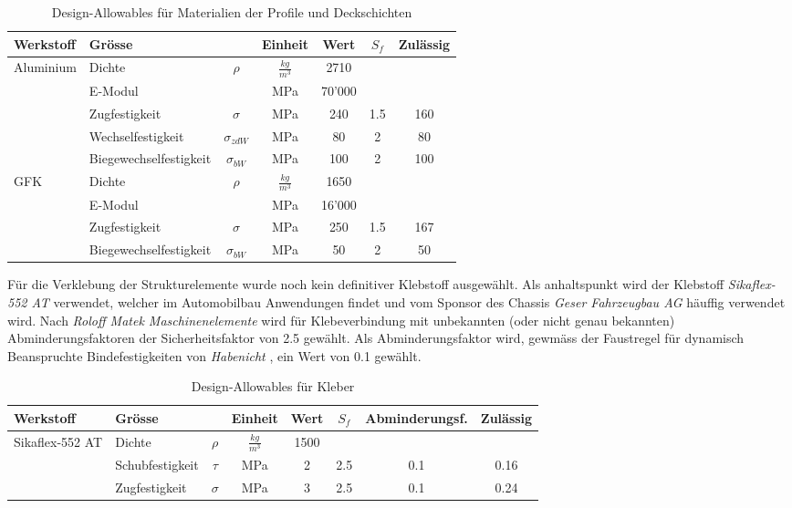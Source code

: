 \begin{table}[H]
  \centering
  \caption{Design-Allowables für Materialien der Profile und Deckschichten}
  \begin{tabular}{llccccc}	\hline
    Werkstoff	&	Grösse	&		&	Einheit	&	Wert	&	$S_f$	&	Zulässig\\	\hline
    \multirow{5}{*}{Aluminium\cite{alu1}}	&	Dichte	&	$\rho$        	&	$\frac{kg}{m^3}$	&	2710	&		&		\\
      &	E-Modul	&	              	&	MPa	&	70'000	&		&		\\
      &	Zugfestigkeit	&	$\sigma$      	&	MPa	&	240	&	1.5	&	160	\\
      &	Wechselfestigkeit	&	$\sigma_{zdW}$	&	MPa	&	80	&	2	&	80	\\
      &	Biegewechselfestigkeit	&	$\sigma_{bW}$ 	&	MPa	&	100	&	2	&	100	\\	\hline
    \multirow{4}{*}{GFK\cite{Roloff}}	&	Dichte	&	$\rho$        	&	$\frac{kg}{m^3}$	&	1650	&		&		\\
      &	E-Modul	&	              	&	MPa	&	16'000	&		&		\\
      &	Zugfestigkeit	&	$\sigma$      	&	MPa	&	250	&	1.5	&	167	\\
      &	Biegewechselfestigkeit	&	$\sigma_{bW}$ 	&	MPa	&	50	&	2	&	50	\\	\hline
  \end{tabular}
  \label{tab:Design-Allowables}
\end{table}

Für die Verklebung der Strukturelemente wurde noch kein definitiver Klebstoff ausgewählt. Als anhaltspunkt wird der Klebstoff \emph{Sikaflex-552 AT} verwendet, welcher im Automobilbau Anwendungen findet und vom Sponsor des Chassis \emph{Geser Fahrzeugbau AG} häuffig verwendet wird. Nach \emph{Roloff Matek Maschinenelemente} wird für Klebeverbindung mit unbekannten (oder nicht genau bekannten) Abminderungsfaktoren der Sicherheitsfaktor von 2.5 gewählt. Als Abminderungsfaktor wird, gewmäss der Faustregel für dynamisch Beanspruchte Bindefestigkeiten von \emph{Habenicht} \cite{kleben1}, ein Wert von 0.1 gewählt.

\begin{table}[H]
  \centering
  \caption{Design-Allowables für Kleber}
  \begin{tabular}{llcccccc}	\hline
    Werkstoff	&	Grösse	&		&	Einheit	&	Wert	&	$S_f$	&	Abminderungsf.&	Zulässig	\\	\hline
    \multirow{3}{*}{Sikaflex-552 AT}	&	Dichte	&	$\rho$        	&	$\frac{kg}{m^3}$	&	1500	&		&		&		\\
      &	Schubfestigkeit	&	$\tau$	&	MPa	&	2	&	2.5	&	0.1	&	0.16	\\
      &	Zugfestigkeit	&	$\sigma$      	&	MPa	&	3	&	2.5	&	0.1	&	0.24	\\	\hline
  \end{tabular}
  \label{tab:Design-Allowables Kleben}
\end{table}

